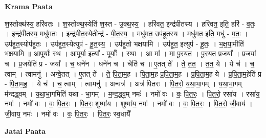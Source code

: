 \documentclass[17pt]{extarticle}
\begin{document}
\textbf{Krama Paata} \newline

श॒स्तोक्थ॑स्य॒ हरि॑वतः । श॒स्तोक्थ॒स्येति॑ श॒स्त - उ॒क्थ॒स्य॒ । हरि॑वत॒ इन्द्र॑पीतस्य । हरि॑वत॒ इति॒ हरि॑ - व॒तः॒ । इन्द्र॑पीतस्य॒ मधु॑मतः । इन्द्र॑पीत॒स्येतीन्द्र॑ - पी॒त॒स्य॒ । मधु॑मत॒ उप॑हूतस्य । मधु॑मत॒ इति॒ मधु॑ - म॒तः॒ । उप॑हूत॒स्योप॑हूतः । उप॑हूत॒स्येत्युप॑ - हू॒त॒स्य॒ । उप॑हूतो भक्षयामि । उप॑हूत॒ इत्युप॑ - हू॒तः॒ । भ॒क्ष॒या॒मीति॑ भक्षयामि ॥ आ॒पूर्याः᳚ स्थ । आ॒पूर्या॒ इत्या᳚ - पूर्याः᳚ । स्था । आ मा᳚ । मा॒ पू॒र॒य॒त॒ । पू॒र॒य॒त॒ प्र॒जया᳚ । प्र॒जया॑ च । प्र॒जयेति॑ प्र - जया᳚ । च॒ धने॑न । धने॑न च । चेति॑ च ॥ ए॒तत् ते᳚ । ते॒ त॒त॒ । त॒त॒ ये । ये च॑ । च॒ त्वाम् । त्वामनु॑ । अन्वे॒तत् । ए॒तत् ते᳚ । ते॒ पि॒ता॒म॒ह॒ । पि॒ता॒म॒ह॒ प्र॒पि॒ता॒म॒ह॒ । प्र॒पि॒ता॒म॒ह॒ ये । प्र॒पि॒ता॒म॒हेति॑ प्र - पि॒ता॒म॒ह॒ । ये च॑ । च॒ त्वाम् । त्वामनु॑ । अन्वत्र॑ । अत्र॑ पितरः । पि॒त॒रो॒ य॒था॒भा॒गम् । य॒था॒भा॒गम् म॑न्दद्ध्वम् । य॒था॒भा॒गमिति॑ यथा - भा॒गम् । म॒न्द॒द्ध्व॒म् नमः॑ । नमो॑ वः । वः॒ पि॒त॒रः॒ । पि॒त॒रो॒ रसा॑य । रसा॑य॒ नमः॑ । नमो॑ वः । वः॒ पि॒त॒रः॒ । पि॒त॒रः॒ शुष्मा॑य । शुष्मा॑य॒ नमः॑ । नमो॑ वः । वः॒ पि॒त॒रः॒ । पि॒त॒रो॒ जी॒वाय॑ । जी॒वाय॒ नमः॑ । नमो॑ वः । वः॒ पि॒त॒रः॒ । पि॒त॒रः॒ स्व॒धायै᳚ \newline

\textbf{Jatai Paata} \newline
\end{document}
